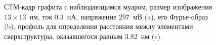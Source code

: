 \documentclass[a4paper, 12pt]{article}
\begin{document}
	\begin{figure}[H]
		\centering
		\caption{СТМ-кадр графита с наблюдающимся муаром, размер изображения $13\times13$~нм, ток 0.3~нА, напряжение 297~мВ (a), его Фурье-образ (b), профиль для определения расстояния между элементами сверхструктуры, оказавшегося равным 3.82~нм (c).}
		\label{fig:2_muar}
	\end{figure}
	
\end{document}
